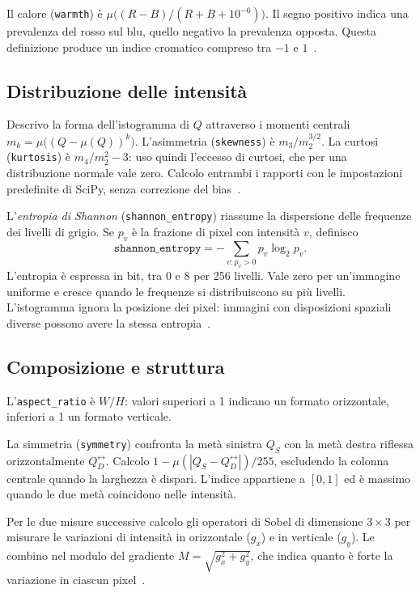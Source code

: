 Il calore (\texttt{warmth}) è $\mu\bigl((R-B)/(R+B+10^{-6})\bigr)$. Il segno positivo indica una prevalenza del rosso sul blu, quello negativo la prevalenza opposta. Questa definizione produce un indice cromatico compreso tra $-1$ e $1$~\cite{Jonauskaite2024}.

\subsection{Distribuzione delle intensità}
\label{subsec:feature-distribuzione}

Descrivo la forma dell'istogramma di $Q$ attraverso i momenti centrali $m_k=\mu\bigl((Q-\mu(Q))^k\bigr)$. L'asimmetria (\texttt{skewness}) è $m_3/m_2^{3/2}$. La curtosi (\texttt{kurtosis}) è $m_4/m_2^2-3$: uso quindi l'eccesso di curtosi, che per una distribuzione normale vale zero. Calcolo entrambi i rapporti con le impostazioni predefinite di SciPy, senza correzione del bias~\cite{2020SciPy-NMeth}.

L'\emph{entropia di Shannon} (\texttt{shannon\_entropy}) riassume la dispersione delle frequenze dei livelli di grigio. Se $p_v$ è la frazione di pixel con intensità $v$, definisco
\begin{equation}
    \texttt{shannon\_entropy}=-\sum_{v:p_v>0}p_v\log_2 p_v.
\end{equation}
L'entropia è espressa in bit, tra 0 e 8 per 256 livelli. Vale zero per un'immagine uniforme e cresce quando le frequenze si distribuiscono su più livelli. L'istogramma ignora la posizione dei pixel: immagini con disposizioni spaziali diverse possono avere la stessa entropia~\cite{6773024}.

\subsection{Composizione e struttura}
\label{subsec:feature-composizione}

L'\texttt{aspect\_ratio} è $W/H$: valori superiori a 1 indicano un formato orizzontale, inferiori a 1 un formato verticale.

La simmetria (\texttt{symmetry}) confronta la metà sinistra $Q_S$ con la metà destra riflessa orizzontalmente $Q_D^{\leftrightarrow}$. Calcolo $1-\mu(|Q_S-Q_D^{\leftrightarrow}|)/255$, escludendo la colonna centrale quando la larghezza è dispari. L'indice appartiene a $[0,1]$ ed è massimo quando le due metà coincidono nelle intensità.

Per le due misure successive calcolo gli operatori di Sobel di dimensione $3\times3$ per misurare le variazioni di intensità in orizzontale ($g_x$) e in verticale ($g_y$). Le combino nel modulo del gradiente $M=\sqrt{g_x^2+g_y^2}$, che indica quanto è forte la variazione in ciascun pixel~\cite{996}.

